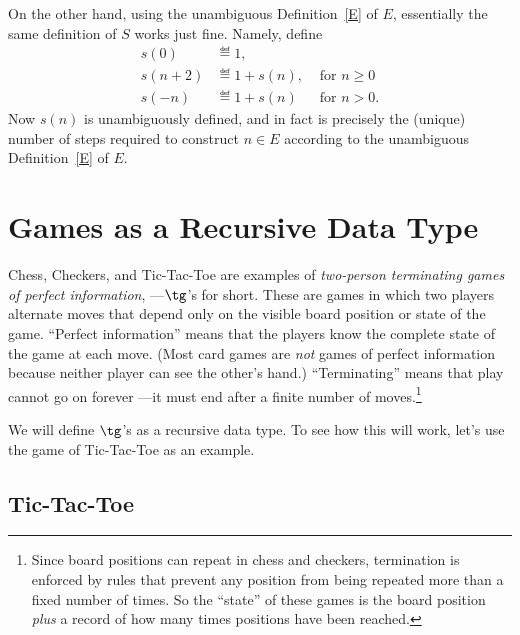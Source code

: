 \begin{definition}
On the other hand, using the unambiguous Definition~\ref{E} of $E$,
essentially the same definition of $S$ works just fine.  Namely, define
\begin{align*}
  s(0) & \eqdef 1,\\
  s(n+2) & \eqdef 1+ s(n), & \text{ for } n \geq 0\\
  s(-n) & \eqdef 1+ s(n) & \text{ for } n > 0.
\end{align*}
Now $s(n)$ is unambiguously defined, and in fact is precisely the (unique)
number of steps required to construct $n \in E$ according to the
unambiguous Definition~\ref{E} of $E$.
\fi

{}


\section{Games as a Recursive Data Type}

Chess, Checkers, and Tic-Tac-Toe are examples of \emph{two-person
terminating games of perfect information}, ---$\tg$'s for short.  These
are games in which two players alternate moves that depend only on the
visible board position or state of the game.  ``Perfect information''
means that the players know the complete state of the game at each move.
(Most card games are \emph{not} games of perfect information because
neither player can see the other's hand.)  ``Terminating'' means that play
cannot go on forever ---it must end after a finite number of
moves.\footnote{Since board positions can repeat in chess and checkers,
termination is enforced by rules that prevent any position from being
repeated more than a fixed number of times.  So the ``state'' of these
games is the board position \emph{plus} a record of how many times
positions have been reached.}

We will define $\tg$'s as a 
recursive data type.  To see how this will work, let's use the game of
Tic-Tac-Toe as an example.

\subsection{Tic-Tac-Toe}


\end{definition}
